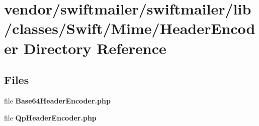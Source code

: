 \section{vendor/swiftmailer/swiftmailer/lib/classes/\+Swift/\+Mime/\+Header\+Encoder Directory Reference}
\label{dir_bdf4315cbe7475232beccdda01b631ab}
\subsection*{Files}
\begin{DoxyCompactItemize}
\item 
file {\bf Base64\+Header\+Encoder.\+php}
\item 
file {\bf Qp\+Header\+Encoder.\+php}
\end{DoxyCompactItemize}
